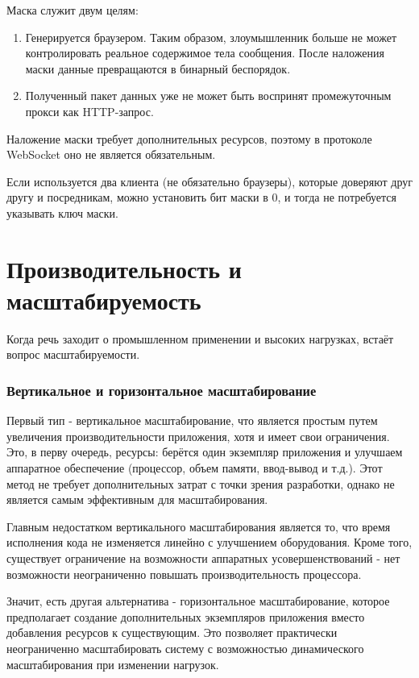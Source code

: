 Маска служит двум целям:
\begin{enumerate}
\item Генерируется браузером. Таким образом, злоумышленник больше не может контролировать реальное содержимое тела сообщения. После наложения маски данные превращаются в бинарный беспорядок.
\item Полученный пакет данных уже не может быть воспринят промежуточным прокси как HTTP-запрос.
\end{enumerate}

Наложение маски требует дополнительных ресурсов, поэтому в протоколе WebSocket оно не является обязательным.

Если используется два клиента (не обязательно браузеры), которые доверяют друг другу и посредникам, можно установить бит маски в 0, и тогда не потребуется указывать ключ маски.

\section{Производительность и масштабируемость}

Когда речь заходит о промышленном применении и высоких нагрузках, встаёт вопрос масштабируемости.

\subsubsection{Вертикальное и горизонтальное масштабирование}

Первый тип - вертикальное масштабирование, что является простым путем увеличения производительности приложения, хотя и имеет свои ограничения. Это, в перву очередь, ресурсы: берётся один экземпляр приложения и улучшаем аппаратное обеспечение (процессор, объем памяти, ввод-вывод и т.д.). Этот метод не требует дополнительных затрат с точки зрения разработки, однако не является самым эффективным для масштабирования.

Главным недостатком вертикального масштабирования является то, что время исполнения кода не изменяется линейно с улучшением оборудования. Кроме того, существует ограничение на возможности аппаратных усовершенствований - нет возможности неограниченно повышать производительность процессора.

Значит, есть другая альтернатива - горизонтальное масштабирование, которое предполагает создание дополнительных экземпляров приложения вместо добавления ресурсов к существующим. Это позволяет практически неограниченно масштабировать систему с возможностью динамического масштабирования при изменении нагрузок.

